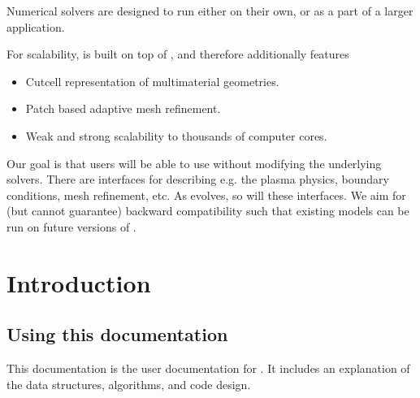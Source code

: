 \documentclass[letterpaper,10pt,english]{sphinxmanual}
\begin{document}
\sphinxAtStartPar
Numerical solvers are designed to run either on their own, or as a part of a larger application.

\sphinxAtStartPar
For scalability,  is built on top of , and therefore additionally features
\begin{itemize}
\item {} 
\sphinxAtStartPar
Cut\sphinxhyphen{}cell representation of multi\sphinxhyphen{}material geometries.

\item {} 
\sphinxAtStartPar
Patch based adaptive mesh refinement.

\item {} 
\sphinxAtStartPar
Weak and strong scalability to thousands of computer cores.

\end{itemize}

\sphinxAtStartPar
Our goal is that users will be able to use  without modifying the underlying solvers.
There are interfaces for describing e.g. the plasma physics, boundary conditions, mesh refinement, etc.
As  evolves, so will these interfaces.
We aim for (but cannot guarantee) backward compatibility such that existing  models can be run on future versions of .




\chapter{Introduction}
\label{\detokenize{index:introduction}}
\sphinxstepscope


\section{Using this documentation}
\label{\detokenize{Base/Documentation:using-this-documentation}}\label{\detokenize{Base/Documentation::doc}}
\sphinxAtStartPar
This documentation is the user documentation for .
It includes an explanation of the data structures, algorithms, and code design.
\end{document}
